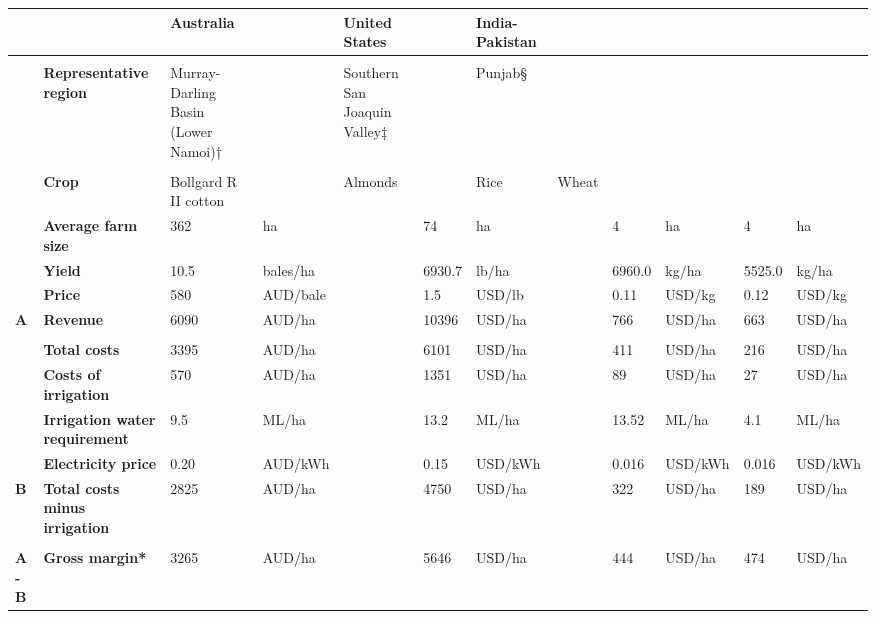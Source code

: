 \documentclass[]{article}
\date{}
\begin{document}
\begin{longtable}[]{@{}llllllllllll@{}}
\toprule
~ & ~ & \textbf{Australia} & \textbf{~} & \textbf{United States} &
\textbf{~} & \textbf{India-Pakistan}\tabularnewline
\midrule
\endhead
& & & & & & & & & & &\tabularnewline
& \textbf{Representative region} & Murray-Darling Basin (Lower Namoi)† &
& Southern San Joaquin Valley‡ & & Punjab§\tabularnewline
& & & & & & & & & & &\tabularnewline
& \textbf{Crop} & Bollgard R II cotton & & Almonds & & Rice &
Wheat\tabularnewline
& \textbf{Average farm size} & 362 & ha & & 74 & ha & & 4 & ha & 4 &
ha\tabularnewline
& \textbf{Yield} & 10.5 & bales/ha & & 6930.7 & lb/ha & & 6960.0 & kg/ha
& 5525.0 & kg/ha\tabularnewline
& \textbf{Price} & 580 & AUD/bale & & 1.5 & USD/lb & & 0.11 & USD/kg &
0.12 & USD/kg\tabularnewline
\textbf{A} & \textbf{Revenue} & 6090 & AUD/ha & & 10396 & USD/ha & & 766
& USD/ha & 663 & USD/ha\tabularnewline
& & & & & & & & & & &\tabularnewline
& \textbf{Total costs} & 3395 & AUD/ha & & 6101 & USD/ha & & 411 &
USD/ha & 216 & USD/ha\tabularnewline
& \textbf{Costs of irrigation} & 570 & AUD/ha & & 1351 & USD/ha & & 89 &
USD/ha & 27 & USD/ha\tabularnewline
& \textbf{Irrigation water requirement} & 9.5 & ML/ha & & 13.2 & ML/ha &
& 13.52 & ML/ha & 4.1 & ML/ha\tabularnewline
& \textbf{Electricity price} & 0.20 & AUD/kWh & & 0.15 & USD/kWh & &
0.016 & USD/kWh & 0.016 & USD/kWh\tabularnewline
\textbf{B} & \textbf{Total costs minus irrigation} & 2825 & AUD/ha & &
4750 & USD/ha & & 322 & USD/ha & 189 & USD/ha\tabularnewline
& & & & & & & & & & &\tabularnewline
\textbf{A - B} & \textbf{Gross margin* } & 3265 & AUD/ha & ~ & 5646 &
USD/ha & ~ & 444 & USD/ha & 474 & USD/ha\tabularnewline
\bottomrule
\end{longtable}
\end{document}
